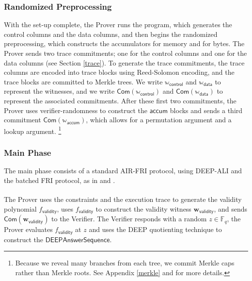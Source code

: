 \documentclass[10pt,letterpaper,titlepage]{article}
\newcommand{\GF}[1]{\mathbb{F}_{#1}}
\theoremstyle{definition}
\begin{document}
\subsubsection{Randomized Preprocessing}
With the set-up complete, the Prover runs the program, which generates the control columns and the data columns, and then begins the randomized preprocessing, which constructs the accumulators for memory and for bytes. 
The Prover sends two trace commitments; one for the control columns and one for the data columns (see Section \ref{trace}). 
To generate the trace commitments, the trace columns are encoded into trace blocks using Reed-Solomon encoding, and the trace blocks are committed to Merkle trees. 
We write $\mathbb{w}_\mathsf{control}$ and $\mathbb{w}_\mathsf{data}$ to represent the witnesses, 
and we write $\mathsf{Com}(\mathbb{w}_\mathsf{control})$ and $\mathsf{Com}(\mathbb{w}_\mathsf{data})$ to represent the associated commitments.
After these first two commitments, the Prover uses verifier-randomness to construct the $\mathsf{accum}$ blocks and sends a third commitment $\mathsf{Com}(\mathbb{w}_\mathsf{accum})$, which allows for a permutation argument and a lookup argument.%
%
\footnote{Because we reveal many branches from each tree, we commit Merkle caps rather than Merkle roots. 
See Appendix \ref{merkle} and \cite{merklecap} for more details.} 

\subsubsection{Main Phase}
The main phase consists of a standard AIR-FRI protocol, using DEEP-ALI\cite{deepFRI} and the batched FRI protocol\cite{proxGaps}, as in \cite{ethSTARK} and \cite{plonky2}.\\
\\
The Prover uses the constraints and the execution trace to generate the validity polynomial $f_\mathsf{validity}$, 
uses $f_\mathsf{validity}$ to construct the validity witness $\mathbf{w}_\mathsf{validity}$,
and sends $\mathsf{Com}(\mathbf{w}_\mathsf{validity})$ to the Verifier.  
The Verifier responds with a random $z\in\GF{q}$, 
the Prover evaluates $f_\mathsf{validity}$ at $z$ and uses the DEEP quotienting technique to construct the $\mathsf{DEEPAnswerSequence}.$
\end{document}
